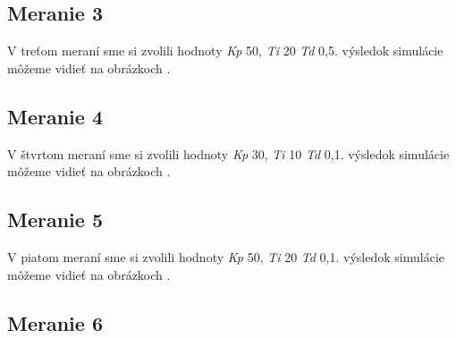 \documentclass{article}
\begin{document}
\subsection{Meranie 3}
\label{sec:meranie3}

V treťom meraní sme si zvolili hodnoty \textit{Kp} 50, \textit{Ti} 20 \textit{Td} 0,5. výsledok simulácie môžeme vidieť na obrázkoch  .


\clearpage



\subsection{Meranie 4}
\label{sec:meranie4}

V štvrtom meraní sme si zvolili hodnoty \textit{Kp} 30, \textit{Ti} 10 \textit{Td} 0,1. výsledok simulácie môžeme vidieť na obrázkoch  .


\clearpage

\subsection{Meranie 5}
\label{sec:meranie5}

V piatom meraní sme si zvolili hodnoty \textit{Kp} 50, \textit{Ti} 20 \textit{Td} 0,1. výsledok simulácie môžeme vidieť na obrázkoch  .


\clearpage

\subsection{Meranie 6}
\label{sec:meranie6}
\end{document}
